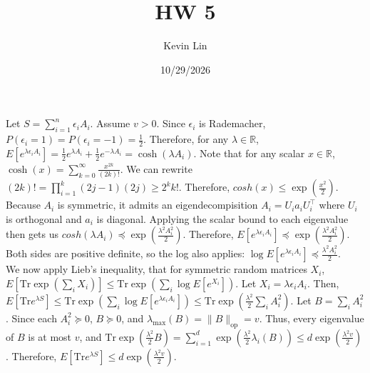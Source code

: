 \documentclass[11pt,a4paper,margin=1in]{article}
\title{HW 5}
\author{Kevin Lin}
\date{10/29/2026}
\begin{document}
\maketitle

\section{}
Let $S = \sum_{i = 1}^n \epsilon_i A_i$. Assume $v > 0$. Since $\epsilon_i$ is
Rademacher, $P(\epsilon_i = 1) = P(\epsilon_i = -1) = \frac{1}{2}$. Therefore,
for any $\lambda \in \mathbb{R}$, $E[e^{\lambda \epsilon_i A_i}] = \frac{1}{2} e^{\lambda A_i} + \frac{1}{2} e^{-\lambda A_i} = \cosh(\lambda A_i)$. 
Note that for any scalar $x \in \mathbb{R}$, $\cosh(x) = \sum_{k = 0}^\infty \frac{x^{2k}}{(2k)!}$.
We can rewrite $(2k)! = \prod_{i = 1}^k (2j - 1)(2j) \geq 2^k k!$. Therefore, 
$cosh(x) \leq \exp(\frac{x^2}{2})$. Because $A_i$ is symmetric, it admits
an eigendecompisition $A_i = U_i a_i U_i^\top$ where $U_i$ is orthogonal and 
$a_i$ is diagonal. Applying the scalar bound to each eigenvalue then gets us
$cosh(\lambda A_i) \preceq \exp(\frac{\lambda^2 A_i^2}{2})$. Therefore, 
$E[e^{\lambda \epsilon_i A_i}] \preceq \exp(\frac{\lambda^2 A_i^2}{2})$. Both
sides are positive definite, so the log also applies: $\log E[e^{\lambda \epsilon_i A_i}] \preceq \frac{\lambda^2 A_i^2}{2}$. \\

\noindent
We now apply Lieb's inequality, that for symmetric random matrices $X_i$,
$E[\text{Tr} \exp(\sum_i X_i)] \leq \text{Tr} \exp(\sum_i \log E[e^{X_i}])$. Let
$X_i = \lambda \epsilon_i A_i$. Then, $E[\text{Tr} e^{\lambda S}] \leq \text{Tr} \exp(\sum_i \log E[e^{\lambda \epsilon_i A_i}]) \leq \text{Tr} \exp(\frac{\lambda^2}{2} \sum_i A_i^2)$.
Let $B = \sum_i A_i^2$. Since each $A_i^2 \succeq 0$, $B \succeq 0$, and $\lambda_{\max}(B) = \|B\|_\text{op} = v$.
Thus, every eigenvalue of $B$ is at most $v$, and $\text{Tr} \exp(\frac{\lambda^2}{2} B) = \sum_{i = 1}^d \exp(\frac{\lambda^2}{2} \lambda_i(B)) \leq d \exp(\frac{\lambda^2 v}{2})$. 
Therefore, $E[\text{Tr} e^{\lambda S}] \leq d \exp(\frac{\lambda^2 v}{2})$. \\
\end{document}
